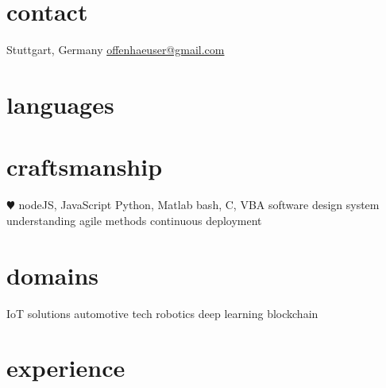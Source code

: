\documentclass[]{friggeri-cv} %
\begin{document}


\begin{aside} %
\section{\color{red}contact}
Stuttgart, Germany
\href{mailto:offenhaeuser@gmail.com}{offenhaeuser@gmail.com}
\section{\color{purple}languages}
\section{\color{green}craftsmanship}
{\color{red} $\varheartsuit$} nodeJS, JavaScript
Python, Matlab
bash, C, VBA
software design
system understanding
agile methods
continuous deployment
\section{\color{blue}domains}
IoT solutions
automotive tech
robotics
deep learning
blockchain
\end{aside}


\section{\color{orange}experience}
\end{document}
